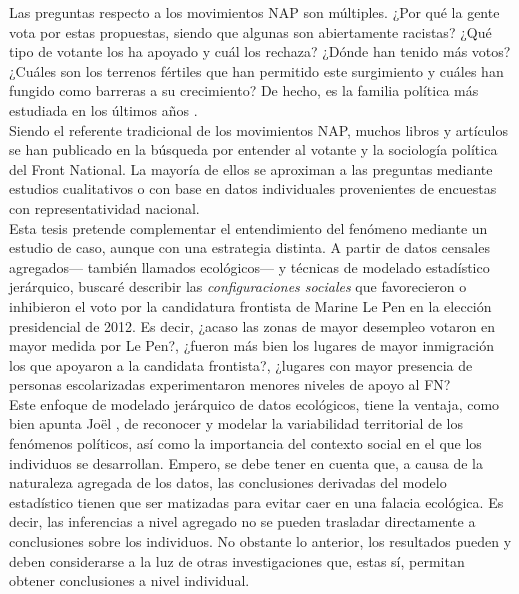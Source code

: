Las preguntas respecto a los movimientos NAP son múltiples. ¿Por qué la gente vota por estas propuestas, siendo que algunas son abiertamente racistas? ¿Qué tipo de votante los ha apoyado y cuál los rechaza? ¿Dónde han tenido más votos? ¿Cuáles son los terrenos fértiles que han permitido este surgimiento y cuáles han fungido como barreras a su crecimiento? De hecho, es la familia política más estudiada en los últimos años \parencite{Mudde16}.\\ 

Siendo el referente tradicional de los movimientos NAP, muchos libros y artículos se han publicado en la búsqueda por entender al votante y la sociología política del Front National. La mayoría de ellos se aproximan a las preguntas mediante estudios cualitativos o con base en datos individuales provenientes de encuestas con representatividad nacional.\\ 

Esta tesis pretende complementar el entendimiento del fenómeno mediante un estudio de caso, aunque con una estrategia distinta. A partir de datos censales agregados--- también llamados ecológicos--- y técnicas de modelado estadístico jerárquico, buscaré describir las \textit{configuraciones sociales} que favorecieron o inhibieron el voto por la candidatura frontista de Marine Le Pen en la elección presidencial de 2012. Es decir, ¿acaso las zonas de mayor desempleo votaron en mayor medida por Le Pen?, ¿fueron más bien los lugares de mayor inmigración los que apoyaron a la candidata frontista?, ¿lugares con mayor presencia de personas escolarizadas experimentaron menores niveles de apoyo al FN?\\

Este enfoque de modelado jerárquico de datos ecológicos, tiene la ventaja, como bien apunta Joël \textcite{Gombin05}, de reconocer y modelar la variabilidad territorial de los fenómenos políticos, así como la importancia del contexto social en el que los individuos se desarrollan. Empero, se debe tener en cuenta que, a causa de la naturaleza agregada de los datos, las conclusiones derivadas del modelo estadístico tienen que ser matizadas para evitar caer en una falacia ecológica. Es decir, las inferencias a nivel agregado no se pueden trasladar directamente a conclusiones sobre los individuos. No obstante lo anterior, los resultados pueden y deben considerarse a la luz de otras investigaciones que, estas sí, permitan obtener conclusiones a nivel individual.\\ 

